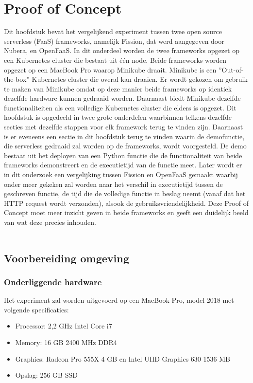 \chapter{Proof of Concept}
\label{ch:proof-of-concept}
Dit hoofdstuk bevat het vergelijkend experiment tussen twee open source serverless (FaaS) frameworks, namelijk Fission, dat werd aangegeven door Nubera, en OpenFaaS. In dit onderdeel worden de twee frameworks opgezet op een Kubernetes cluster die bestaat uit één node. Beide frameworks worden opgezet op een MacBook Pro waarop Minikube draait. Minikube is een ''Out-of-the-box'' Kubernetes cluster die overal kan draaien. Er wordt gekozen om gebruik te maken van Minikube omdat op deze manier beide frameworks op identiek dezelfde hardware kunnen gedraaid worden. Daarnaast biedt Minikube dezelfde functionaliteiten als een volledige Kubernetes cluster die elders is opgezet. Dit hoofdstuk is opgedeeld in twee grote onderdelen waarbinnen telkens dezelfde secties met dezelfde stappen voor elk framework terug te vinden zijn. Daarnaast is er eveneens een sectie in dit hoofdstuk terug te vinden waarin de demofunctie, die serverless gedraaid zal worden op de frameworks, wordt voorgesteld. De demo bestaat uit het deployen van een Python functie die de functionaliteit van beide frameworks demonstreert en de executietijd van de functie meet. Later wordt er in dit onderzoek een vergelijking tussen Fission en OpenFaaS gemaakt waarbij onder meer gekeken zal worden naar het verschil in executietijd tussen de geschreven functie, de tijd die de volledige functie in beslag neemt (vanaf dat het HTTP request wordt verzonden), alsook de gebruiksvriendelijkheid. Deze Proof of Concept moet meer inzicht geven in beide frameworks en geeft een duidelijk beeld van wat deze precies inhouden.
\\\\
\section{Voorbereiding omgeving}
\label{sec:voorbereiding-omgeving}
\subsection{Onderliggende hardware}
Het experiment zal worden uitgevoerd op een MacBook Pro, model 2018 met volgende specificaties:
\begin{itemize}
    \item Processor: 2,2 GHz Intel Core i7
    \item Memory: 16 GB 2400 MHz DDR4
    \item Graphics: Radeon Pro 555X 4 GB en Intel UHD Graphics 630 1536 MB
    \item Opslag: 256 GB SSD
\end{itemize}

